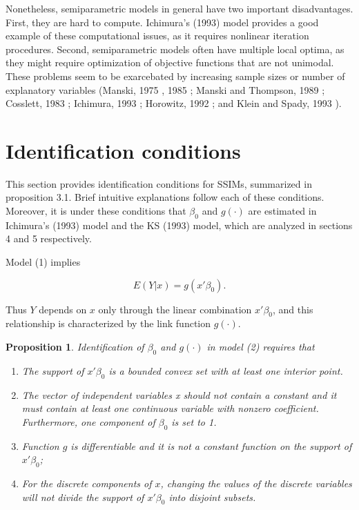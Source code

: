 Nonetheless, semiparametric models in general have two important disadvantages. First, they are hard to compute. Ichimura's (1993) \cite{[6]} model provides a good example of these computational issues, as it requires nonlinear iteration procedures. Second, semiparametric models often have multiple local optima, as they might require optimization of objective functions that are not unimodal. These problems seem to be exarcebated by increasing sample sizes or number of explanatory variables (Manski, 1975 \cite{[7]}, 1985 \cite{[8]}; Manski and Thompson, 1989 \cite{[9]}; Cosslett, 1983 \cite{[10]}; Ichimura, 1993 \cite{[6]}; Horowitz, 1992 \cite{[11]}; and Klein and Spady, 1993 \cite{[12]} ).


\section{Identification conditions} %
\label{sec:Identification conditions}

This section provides identification conditions for SSIMs,  summarized in proposition 3.1. Brief intuitive explanations follow each of these conditions. Moreover, it is under these conditions that $\beta_0$ and $ g(\cdot)$ are estimated in Ichimura's (1993) \cite{[6]} model and the KS (1993) \cite{[12]} model, which are analyzed in sections 4 and 5 respectively.


Model (1) implies

\begin{equation}
E(Y|x) = g(x'\beta_0).
\end{equation}

Thus $Y$ depends on $x$ only through the linear combination $x'\beta_0$, and this relationship is characterized by the link function $g(\cdot)$. 


\newtheorem{prop}{Proposition}[section]

\begin{prop}
Identification of $\beta_0$ and $g(\cdot)$ in model (2) requires that
\begin{enumerate}[label=(\roman*)]
\item The support of $x'\beta_0$ is a bounded convex set with at least one interior point. 
\item The vector of independent variables x should not contain a constant and it must contain at least one continuous variable with nonzero coefficient. Furthermore, one component of $\beta_0$ is set to 1. 
\item Function $g$ is differentiable and it is not a constant function on the support of $x'\beta_0$;
\item For the discrete components of $x$, changing the values of the discrete variables will not divide the support of $x'\beta_0$ into disjoint subsets.
\end{enumerate}
\end{prop}

